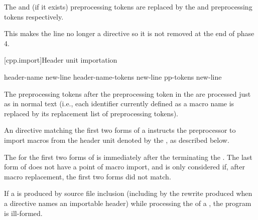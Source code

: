 \pnum
The  and  (if it exists) preprocessing tokens
are replaced by the  and
 preprocessing tokens respectively.
\begin{note}
This makes the line no longer a directive
so it is not removed at the end of phase 4.
\end{note}

[cpp.import]{Header unit importation}
%
%
%

\begin{bnf}
\br
      header-name  \terminal{;} new-line\br
      header-name-tokens  \terminal{;} new-line\br
      pp-tokens \terminal{;} new-line
\end{bnf}

\pnum
The preprocessing tokens after the  preprocessing token
in the  
are processed just as in normal text
(i.e., each identifier currently defined as a macro name
is replaced by its replacement list of preprocessing tokens).
\begin{note}
An  directive
matching the first two forms of a 
instructs the preprocessor to import macros
from the header unit
denoted by the ,
as described below.
\end{note}
%
The  for the
first two forms of  is
immediately after the  terminating
the .
The last form of 
does not have a point of macro import, and
is only considered if, after macro replacement,
the first two forms did not match.

\pnum
If a  is produced by source file inclusion
(including by the rewrite produced
when a  directive names an importable header)
while processing the  of a ,
the program is ill-formed.

